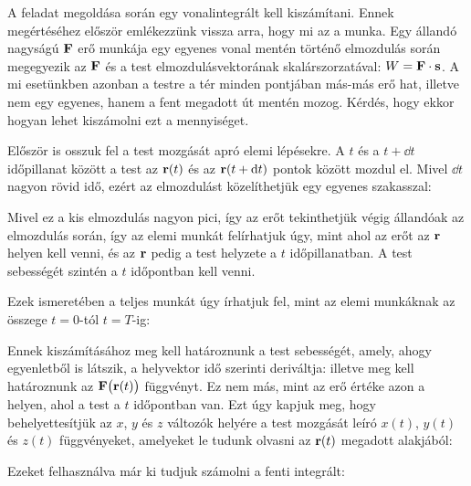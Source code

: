 
\ifdefined\megoldas

 A feladat megoldása során egy vonalintegrált kell kiszámítani. Ennek megértéséhez először emlékezzünk vissza arra, hogy mi az a munka. Egy állandó nagyságú $\mathbf{F}$ erő munkája egy egyenes vonal mentén történő elmozdulás során megegyezik az $\mathbf{F}$ és a test elmozdulásvektorának skalárszorzatával: $W=\mathbf{F}\cdot \mathbf{s}$. A mi esetünkben azonban a testre a tér minden pontjában más-más erő hat, illetve nem egy egyenes, hanem a fent megadott út mentén mozog. Kérdés, hogy ekkor hogyan lehet kiszámolni ezt a mennyiséget. 

 Először is osszuk fel a test mozgását apró elemi lépésekre. A $t$ és a $t+\dd t$ időpillanat között a test az $\mathbf{r}(t)$ és az $\mathbf{r}(t+\mathrm{d} t)$ pontok között mozdul el. Mivel $\dd t$ nagyon rövid idő, ezért az elmozdulást közelíthetjük egy egyenes szakasszal:

 Mivel ez a kis elmozdulás nagyon pici, így az erőt tekinthetjük végig állandóak az elmozdulás során, így az elemi munkát felírhatjuk úgy, mint 
 ahol az erőt az $\mathbf{r}$ helyen kell venni, és az $\mathbf{r}$ pedig a test helyzete a $t$ időpillanatban. A test sebességét szintén a $t$ időpontban kell venni.

 Ezek ismeretében a teljes munkát úgy írhatjuk fel, mint az elemi munkáknak az összege $t=0$-tól $t=T$-ig:

 Ennek kiszámításához meg kell határoznunk a test sebességét, amely, ahogy  egyenletből is látszik, a helyvektor idő szerinti deriváltja:
 illetve meg kell határoznunk az $\mathbf{F}\big(\mathbf{r}(t)\big)$ függvényt. Ez nem más, mint az erő értéke azon a helyen, ahol a test a $t$ időpontban van. Ezt úgy kapjuk meg, hogy behelyettesítjük az $x$, $y$ és $z$ változók helyére a test mozgását leíró $x(t)$, $y(t)$ és $z(t)$ függvényeket, amelyeket le tudunk olvasni az $\mathbf{r}(t)$ megadott alakjából:

 Ezeket felhasználva már ki tudjuk számolni a fenti integrált:

\fi